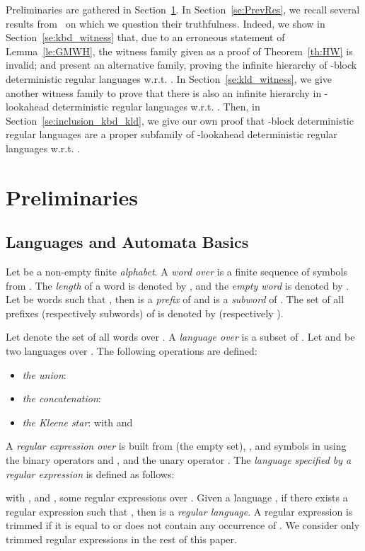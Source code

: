 \documentclass{llncs}
\begin{document}
	Preliminaries are gathered in Section~\ref{se:pre}.
	In Section~\ref{se:PrevRes}, we recall several results from~\cite{GMW01,HW08} on which we question their truthfulness.
	Indeed, we show in Section~\ref{se:kbd_witness} that, due to an erroneous statement of Lemma~\ref{le:GMWH}, the witness family given as a proof of Theorem~\ref{th:HW} is invalid; and present an alternative family, proving the infinite hierarchy of -block deterministic regular languages w.r.t. .
	In Section~\ref{se:kld_witness}, we give another witness family to prove that there is also an infinite hierarchy in -lookahead deterministic regular languages w.r.t. .
	Then, in Section~\ref{se:inclusion_kbd_kld}, we give our own proof that -block deterministic regular languages are a proper subfamily of -lookahead deterministic regular languages w.r.t. .


\section{Preliminaries}\label{se:pre}

\subsection{Languages and Automata Basics}
	Let  be a non-empty finite \emph{alphabet}.
A \emph{word  over } is a finite sequence of symbols from .
The \emph{length} of a word  is denoted by , and the \emph{empty word} is denoted by .
Let  be words such that , then  is a \emph{prefix} of  and  is a \emph{subword} of .
The set of all prefixes (respectively subwords) of  is denoted by  (respectively ).

	Let  denote the set of all words over .
A \emph{language over } is a subset of .
Let  and  be two languages over . The following operations are defined:
\begin{itemize}
	\item \emph{the union}: 
	\item \emph{the concatenation}: 
	\item \emph{the Kleene star}:  with  and 
\end{itemize}

	A \emph{regular expression over } is built from  (the empty set), , and symbols in  using the binary operators  and , and the unary operator .
	The \emph{language}  \emph{specified by a regular expression } is defined as follows:

with , and ,  some regular expressions over .
	Given a language , if there exists a regular expression  such that , then  is a \emph{regular language}.
	A regular expression is trimmed if it is equal to  or does not contain any occurrence of .
	We consider only trimmed regular expressions in the rest of this paper.
\end{document}
